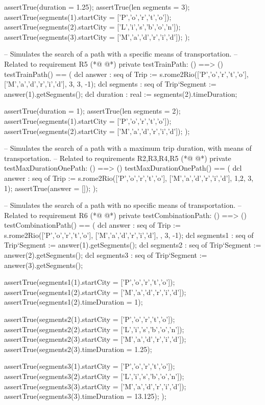 \begin{vdmpp}[breaklines=true]
    assertTrue(duration = 1.25);
    assertTrue(len segments = 3);
    assertTrue(segments(1).startCity = ['P','o','r','t','o']);
    assertTrue(segments(2).startCity = ['L','i','s','b','o','n']);
    assertTrue(segments(3).startCity = ['M','a','d','r','i','d']);
  );
    
  -- Simulates the search of a path with a specific means of transportation.
 -- Related to requirement R5
(*@
\label{testTrainPath:67}
@*)
  private testTrainPath: () ==> ()
  testTrainPath() == (
    dcl answer : seq of Trip := s.rome2Rio(['P','o','r','t','o'], ['M','a','d','r','i','d'], {3}, 3, -1);
   dcl segments : seq of Trip`Segment := answer(1).getSegments();
    dcl duration : real := segments(2).timeDuration;
    
    assertTrue(duration = 1);
    assertTrue(len segments = 2);
    assertTrue(segments(1).startCity = ['P','o','r','t','o']);
    assertTrue(segments(2).startCity = ['M','a','d','r','i','d']);
  );
   
  -- Simulates the search of a path with a maximum trip duration, with means of transportation.
 -- Related to requirements R2,R3,R4,R5
(*@
\label{testMaxDurationOnePath:81}
@*)
  private testMaxDurationOnePath: () ==> ()
  testMaxDurationOnePath() == (
    dcl answer : seq of Trip := s.rome2Rio(['P','o','r','t','o'], ['M','a','d','r','i','d'], {1,2}, 3, 1);
    assertTrue(answer = []);
  );  
    
 -- Simulates the search of a path with no specific means of transportation.
 -- Related to requirement R6
(*@
\label{testCombinationPath:89}
@*)
 private testCombinationPath: () ==> ()
 testCombinationPath() == (
   dcl answer : seq of Trip := s.rome2Rio(['P','o','r','t','o'], ['M','a','d','r','i','d'], {}, 3, -1);
   dcl segments1 : seq of Trip`Segment := answer(1).getSegments();
   dcl segments2 : seq of Trip`Segment := answer(2).getSegments();
   dcl segments3 : seq of Trip`Segment := answer(3).getSegments();
   
   assertTrue(segments1(1).startCity = ['P','o','r','t','o']);
   assertTrue(segments1(2).startCity = ['M','a','d','r','i','d']);
   assertTrue(segments1(2).timeDuration = 1);
   
   assertTrue(segments2(1).startCity = ['P','o','r','t','o']);
   assertTrue(segments2(2).startCity = ['L','i','s','b','o','n']);
   assertTrue(segments2(3).startCity = ['M','a','d','r','i','d']);
   assertTrue(segments2(3).timeDuration = 1.25);
   
   assertTrue(segments3(1).startCity = ['P','o','r','t','o']);
   assertTrue(segments3(2).startCity = ['L','i','s','b','o','n']);
   assertTrue(segments3(3).startCity = ['M','a','d','r','i','d']);
   assertTrue(segments3(3).timeDuration = 13.125);
 );
  

\end{vdmpp}
